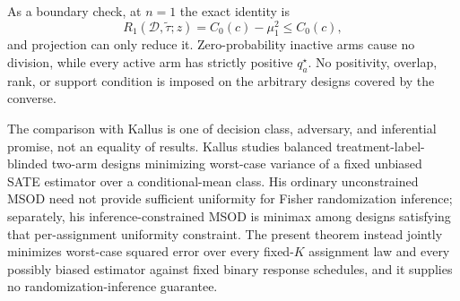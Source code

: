 As a boundary check, at \(n=1\) the exact identity is
\[
 R_1(\mathcal D,\widetilde\tau;z)=C_0(c)-\mu_1^2\leq C_0(c),
\]
and projection can only reduce it.  Zero-probability inactive arms cause no division, while every active arm has strictly positive \(q_a^\star\).  No positivity, overlap, rank, or support condition is imposed on the arbitrary designs covered by the converse.

The comparison with Kallus is one of decision class, adversary, and inferential promise, not an equality of results.  Kallus studies balanced treatment-label-blinded two-arm designs minimizing worst-case variance of a fixed unbiased SATE estimator over a conditional-mean class.  His ordinary unconstrained MSOD need not provide sufficient uniformity for Fisher randomization inference; separately, his inference-constrained MSOD is minimax among designs satisfying that per-assignment uniformity constraint.  The present theorem instead jointly minimizes worst-case squared error over every fixed-\(K\) assignment law and every possibly biased estimator against fixed binary response schedules, and it supplies no randomization-inference guarantee.
